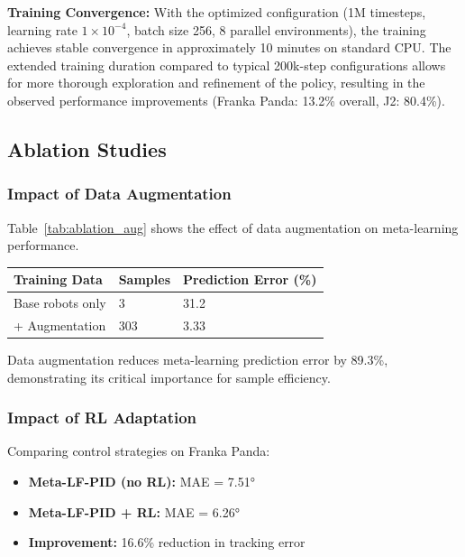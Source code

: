 \documentclass[DTMColor]{ROB-New}
\begin{document}
\textbf{Training Convergence:} With the optimized configuration (1M timesteps, learning rate $1 \times 10^{-4}$, batch size 256, 8 parallel environments), the training achieves stable convergence in approximately 10 minutes on standard CPU. The extended training duration compared to typical 200k-step configurations allows for more thorough exploration and refinement of the policy, resulting in the observed performance improvements (Franka Panda: 13.2\% overall, J2: 80.4\%).

\subsection{Ablation Studies}

\subsubsection{Impact of Data Augmentation}

Table~\ref{tab:ablation_aug} shows the effect of data augmentation on meta-learning performance.

\begin{table}[h]
{\begin{fntable}\centering
\begin{tabular}{@{\extracolsep{\fill}}lll}
\hline
\textbf{Training Data} & \textbf{Samples} & \textbf{Prediction Error (\%)} \\
\hline
Base robots only & 3 & 31.2 \\
+ Augmentation & 303 & 3.33 \\
\hline
\end{tabular}
\end{fntable}}
\end{table}

Data augmentation reduces meta-learning prediction error by 89.3\%, demonstrating its critical importance for sample efficiency.

\subsubsection{Impact of RL Adaptation}

Comparing control strategies on Franka Panda:
\begin{itemize}
    \item \textbf{Meta-LF-PID (no RL):} MAE = 7.51°
    \item \textbf{Meta-LF-PID + RL:} MAE = 6.26°
    \item \textbf{Improvement:} 16.6\% reduction in tracking error
\end{itemize}
\end{document}
